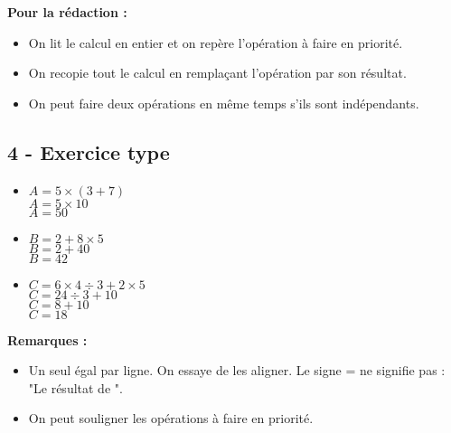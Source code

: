 \textbf{Pour la rédaction :}

\begin{itemize}[label={$\bullet$}]
  \item On lit le calcul en entier et on repère l'opération à faire en priorité.
  \item On recopie tout le calcul en remplaçant l'opération par son résultat.
  \item On peut faire deux opérations en même temps s'ils sont indépendants. 
\end{itemize}

\subsection*{4 - Exercice type}

\begin{multicols}{3}

\begin{itemize}[label={$\bullet$}]
  \item $A = 5 \times (3 + 7) $ \\
        $A = 5 \times 10 $ \\
        $A = 50 $ 

  \item $B = 2 + 8 \times 5 $ \\
        $B = 2 + 40$ \\
        $B = 42$ 

  \item $C = 6 \times 4 \div 3 + 2 \times 5 $\\
        $C = 24 \div 3 + 10 $\\
        $C = 8 + 10 $\\
        $C = 18 $
\end{itemize}

\end{multicols}

\textbf{Remarques : }
\begin{itemize}[label={$\bullet$}]
  \item Un seul égal par ligne. On essaye de les aligner. Le signe = ne signifie pas : "Le résultat de ".
  \item On peut souligner les opérations à faire en priorité. 
\end{itemize}



